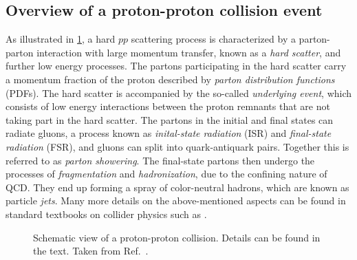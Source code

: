
\subsection{Overview of a proton-proton collision event}
\label{subsec:pp-collision-overview}
As illustrated in \cref{fig:ppcol}, a hard $pp$ scattering process is characterized by a parton-parton interaction with large momentum transfer, known as a \emph{hard scatter}, and further low energy processes.
The partons participating in the hard scatter carry a momentum fraction of the proton described by \emph{parton distribution functions} (PDFs).
The hard scatter is accompanied by the so-called \emph{underlying event}, which consists of low energy interactions between the proton remnants that are not taking part in the hard scatter.
The partons in the initial and final states can radiate gluons, a process known as \emph{inital-state radiation} (ISR) and \emph{final-state radiation} (FSR), and gluons can split into quark-antiquark pairs. Together this is referred to as \emph{parton showering}.
The final-state partons then undergo the processes of \emph{fragmentation} and \emph{hadronization}, due to the confining nature of QCD. They end up forming a spray of color-neutral hadrons, which are known as particle \emph{jets}. Many more details on the above-mentioned aspects can be found in standard textbooks on collider physics such as . 

\begin{figure}[t]
  \caption[Schematic view of a proton-proton collision.]{Schematic view of a proton-proton collision. Details can be found in the text. Taken from Ref.~\cite{Bhatti2010}. }
  \label{fig:ppcol}
\end{figure}



